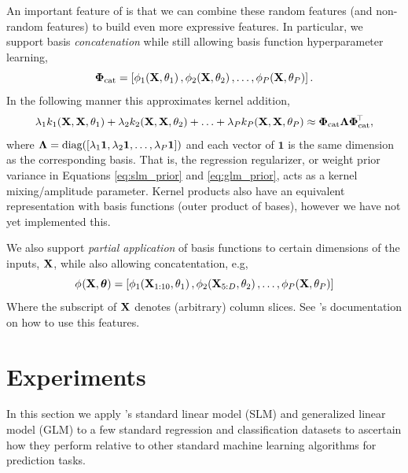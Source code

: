 \documentclass[11pt, oneside]{article}
\begin{document}
An important feature of \revrand{} is that we can combine these random features
(and non-random features) to build even more expressive features. In
particular, we support basis \emph{concatenation} while still allowing basis
function hyperparameter learning,
\begin{equation}
    \feat_{\text{cat}} = \sbrac{
        \func{\featsym}{\ins, \param_1}{1},
        \func{\featsym}{\ins, \param_2}{2},
        \ldots,
        \func{\featsym}{\ins, \param_P}{P}
    }.
\end{equation}
In the following manner this approximates kernel addition,
\begin{equation}
    \reg_1 \kernl_1\!\brac{\ins, \ins, \param_1} +
    \reg_2 \kernl_2\!\brac{\ins, \ins, \param_2} + \ldots +
    \reg_P \kernl_P\!\brac{\ins, \ins, \param_P} \approx
    \feat_{\text{cat}} \Reg \feat_{\text{cat}}\T,
\end{equation}
where $\Reg = \diag{\sbrac{\reg_1 \mathbf{1}, \reg_2 \mathbf{1}, \ldots, \reg_P
        \mathbf{1}}}$ and each vector of $\mathbf{1}$ is the same dimension as
the corresponding basis. That is, the regression regularizer, or weight prior
variance in Equations \eqref{eq:slm_prior} and \eqref{eq:glm_prior}, acts as a
kernel mixing/amplitude parameter.  Kernel products also have an equivalent
representation with basis functions (outer product of bases), however we have
not yet implemented this.

We also support \emph{partial application} of basis functions to certain
dimensions of the inputs, $\ins$, while also allowing concatentation, e.g,
\begin{equation}
    \func{\featsym}{\ins, \boldsymbol\param}{} = \sbrac{
        \func{\featsym}{\ins_{1:10}, \param_1}{1},
        \func{\featsym}{\ins_{5:D}, \param_2}{2},
        \ldots,
        \func{\featsym}{\ins, \param_P}{P}
    } 
\end{equation}
Where the subscript of $\ins$ denotes (arbitrary) column slices. See
\revrand{}'s documentation on how to use this features.


\section{Experiments}

In this section we apply \revrand{}'s standard linear model (SLM) and
generalized linear model (GLM) to a few standard regression and classification
datasets to ascertain how they perform relative to other standard machine
learning algorithms for prediction tasks.
\end{document}

